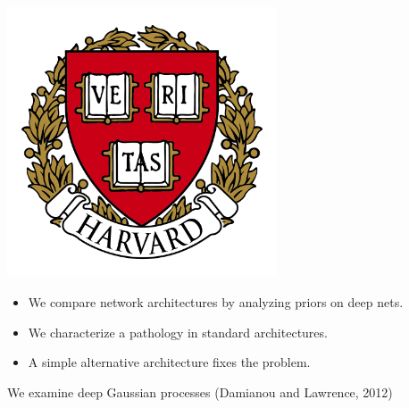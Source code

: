 \documentclass[portrait,a0b,final,a4resizeable]{include/a0poster}
\def\jointspacing{\vspace{0.3in}}
\begin{document}
\begin{poster}
\begin{center}
\begin{pcolumn}{1.03}
{{\begin{minipage}[c]{\logowidth}
\begin{flushright}
    \includegraphics[width=8cm,trim=2em 0em 2em 2em, clip]{badges/harvard}
  \end{flushright}
\end{minipage}}
%
}
\end{pcolumn}
\end{center}

\vspace*{1.5cm}

\large



\Large

\begin{multicols}{2}



\vspace*{-1cm}
\null\hspace*{3cm}\begin{minipage}[c]{0.85\columnwidth}
\centering
\begin{itemize}
\item We compare network architectures by analyzing priors on deep nets.
\item We characterize a pathology in standard architectures.
\item A simple alternative architecture fixes the problem.
\end{itemize}
\end{minipage}

\jointspacing


\center
We examine deep Gaussian processes { \color{mydarkblue} (Damianou and Lawrence, 2012) }
\begin{centering}

\end{centering}



\end{multicols}
\end{poster}
\end{document}
